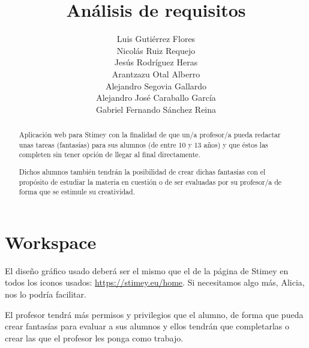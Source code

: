 \documentclass[12pt,letterpaper]{article}
\title{Análisis de requisitos}
\author{Luis Gutiérrez Flores\\
	Nicolás Ruiz Requejo\\
	Jesús Rodríguez Heras\\
	Arantzazu Otal Alberro\\
	Alejandro Segovia Gallardo\\
	Alejandro José Caraballo García\\
	Gabriel Fernando Sánchez Reina}
\begin{document}
	
	\maketitle
	\begin{abstract} %
			Aplicación web para Stimey con la finalidad de que un/a profesor/a pueda redactar unas tareas (fantasías) para sus alumnos (de entre 10 y 13 años) y que éstos las completen sin tener opción de llegar al final directamente.
			
			Dichos alumnos también tendrán la posibilidad de crear dichas fantasías con el propósito de estudiar la materia en cuestión o de ser evaluadas por su profesor/a de forma que se estimule su creatividad.
	\end{abstract}
	\thispagestyle{empty}
	\newpage
	
	
	
	
	
	\lstset{language=bash, numbers=left, numberstyle=\tiny, numbersep=10pt, firstnumber=1, stepnumber=1, basicstyle=\small\ttfamily, tabsize=1, extendedchars=true, inputencoding=latin1}

\section{Workspace}
El diseño gráfico usado deberá ser el mismo que el de la página de Stimey en todos los iconos usados: \url{https://stimey.eu/home}. Si necesitamos algo más, Alicia, nos lo podría facilitar.

El profesor tendrá más permisos y privilegios que el alumno, de forma que pueda crear fantasías para evaluar a sus alumnos y ellos tendrán que completarlas o crear las que el profesor les ponga como trabajo.
\end{document}

